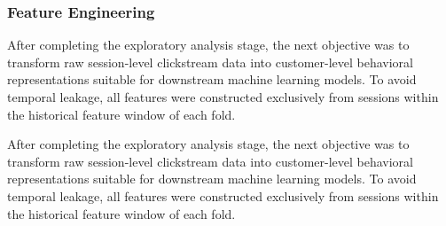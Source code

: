 \documentclass[conference]{IEEEtran}
\begin{document}
\subsubsection{Feature Engineering}

After completing the exploratory analysis stage, the next objective
was to transform raw session-level clickstream data into
customer-level behavioral representations suitable for downstream
machine learning models. To avoid temporal leakage, all features
were constructed exclusively from sessions within the historical
feature window of each fold.

After completing the exploratory analysis stage, the next
objective was to transform raw session-level clickstream
data into customer-level behavioral representations suitable
for downstream machine learning models. To avoid temporal
leakage, all features were constructed exclusively from
sessions within the historical feature window of each fold.
\end{document}
